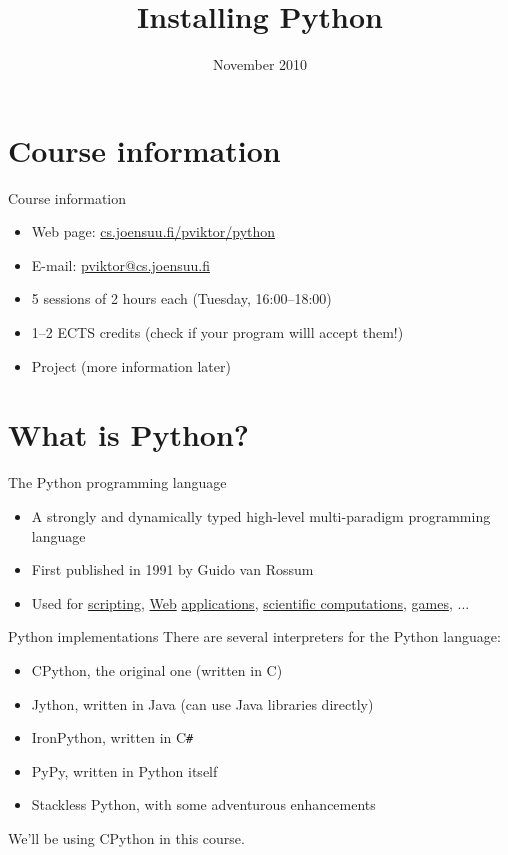 \documentclass{pyslides}
\title{Installing Python}
\date{November 2010}
\begin{document}
\begin{frame}\titlepage\end{frame}

\section{Course information}

\begin{frame}{Course information}
\begin{itemize}
\item Web page: \href{http://cs.joensuu.fi/~pviktor/python}{cs.joensuu.fi/{\texttildelow}pviktor/python}
\item E-mail: \href{mailto:pviktor@cs.joensuu.fi}{pviktor@cs.joensuu.fi}
\item 5 sessions of 2 hours each (Tuesday, 16:00--18:00)
\item 1--2 ECTS credits {\small (check if your program willl accept them!)}
\item Project {\small (more information later)}
\end{itemize}
\end{frame}

\section{What is Python?}

\begin{frame}{The Python programming language}
\begin{itemize}
\item A strongly and dynamically typed high-level multi-paradigm programming language
\item First published in 1991 by Guido van Rossum
\item Used for
        \href{http://www.blender.org/education-help/python/}{scripting},
        \href{http://www.reddit.com/}{Web} \href{http://youtube.com/}{applications},
        \href{http://www.scipy.org/Cookbook/OptimizationDemo1}{scientific computations},
        \href{http://www.prairiegames.com/}{games}, ...
\end{itemize}
\end{frame}

\begin{frame}[fragile]{Python implementations}
There are several interpreters for the Python language:
\begin{itemize}
\item CPython, the original one (written in C)
\item Jython, written in Java {\small (can use Java libraries directly)}
\item IronPython, written in C\verb/#/
\item PyPy, written in Python itself
\item Stackless Python, with some adventurous enhancements
\end{itemize}
\bigskip
We'll be using CPython in this course.
\end{frame}
\end{document}
